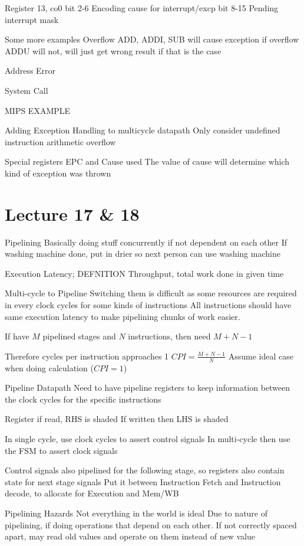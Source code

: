 \documentclass{article}
\begin{document}
		Register 13, co0
		bit 2-6	Encoding cause for interrupt/excp
		bit 8-15	Pending interrupt mask

	Some more examples
		Overflow
			ADD, ADDI, SUB will cause exception if overflow
			ADDU will not, will just get wrong result if that is the case

		Address Error

		System Call

		MIPS EXAMPLE

	Adding Exception Handling to multicycle datapath
		Only consider
			undefined instruction
			arithmetic overflow

		Special registers EPC and Cause used
			The value of cause will determine which kind of exception was thrown

\section{Lecture 17 \& 18}
	Pipelining
		Basically doing stuff concurrently if not dependent on each other
		If washing machine done, put in drier so next person can use washing machine

		Execution Latency; DEFNITION
		Throughput, total work done in given time

	Multi-cycle to Pipeline
		Switching them is difficult as some resources are required in every clock cycles for some kinds of instructions
		All instructions should have same execution latency to make pipelining chunks of work easier.

		If have $M$ pipelined stages and $N$ instructions, then need $M + N - 1$

		Therefore cycles per instruction approaches 1
		$CPI = \frac{M + N - 1}{N}$
		Assume ideal case when doing calculation ($CPI = 1$)

	Pipeline Datapath
		Need to have pipeline registers to keep information between the clock cycles for the specific instructions

		Register if read, RHS is shaded
		If written then LHS is shaded

		In single cycle, use clock cycles to assert control signals
		In multi-cycle then use the FSM to assert clock signals

		Control signals also pipelined for the following stage, so registers also contain state for next stage signals
		Put it between Instruction Fetch and Instruction decode, to allocate for Execution and Mem/WB

	Pipelining Hazards
		Not everything in the world is ideal
		Due to nature of pipelining, if doing operations that depend on each other. If not correctly spaced apart, may read old values and operate on them instead of new value
\end{document}
